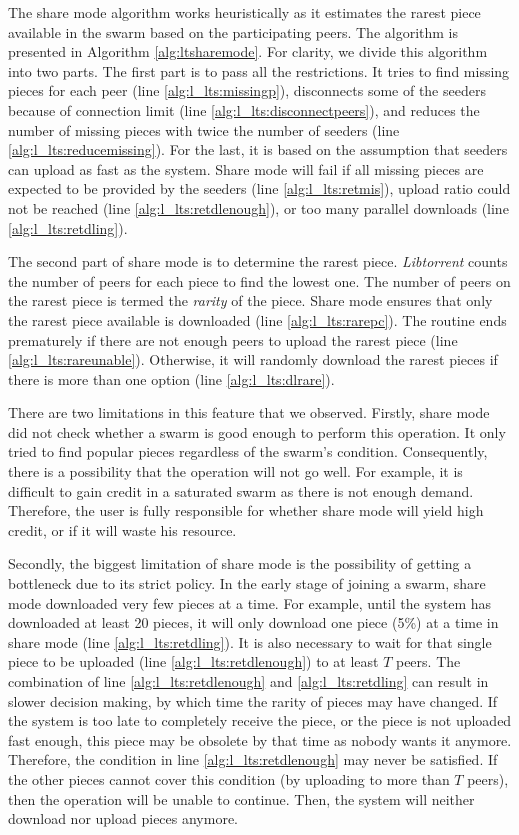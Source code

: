 The share mode algorithm works heuristically as it estimates the rarest piece available in the swarm based on the participating peers. The algorithm is presented in Algorithm \ref{alg:ltsharemode}. For clarity, we divide this algorithm into two parts. The first part is to pass all the restrictions. It tries to find missing pieces for each peer (line \ref{alg:l_lts:missingp}), disconnects some of the seeders because of connection limit (line \ref{alg:l_lts:disconnectpeers}), and reduces the number of missing pieces with twice the number of seeders (line \ref{alg:l_lts:reducemissing}). For the last, it is based on the assumption that seeders can upload as fast as the system. Share mode will fail if all missing pieces are expected to be provided by the seeders (line \ref{alg:l_lts:retmis}), upload ratio could not be reached (line \ref{alg:l_lts:retdlenough}), or too many parallel downloads (line \ref{alg:l_lts:retdling}).

The second part of share mode is to determine the rarest piece. \textit{Libtorrent} counts the number of peers for each piece to find the lowest one. The number of peers on the rarest piece is termed the \textit{rarity} of the piece. Share mode ensures that only the rarest piece available is downloaded (line \ref{alg:l_lts:rarepc}). The routine ends prematurely if there are not enough peers to upload the rarest piece (line \ref{alg:l_lts:rareunable}). Otherwise, it will randomly download the rarest pieces if there is more than one option (line \ref{alg:l_lts:dlrare}). 



There are two limitations in this feature that we observed. Firstly, share mode did not check whether a swarm is good enough to perform this operation. It only tried to find popular pieces regardless of the swarm's condition. Consequently, there is a possibility that the operation will not go well. For example, it is difficult to gain credit in a saturated swarm as there is not enough demand. Therefore, the user is fully responsible for whether share mode will yield high credit, or if it will waste his resource.

Secondly, the biggest limitation of share mode is the possibility of getting a bottleneck due to its strict policy. In the early stage of joining a swarm, share mode downloaded very few pieces at a time. For example, until the system has downloaded at least 20 pieces, it will only download one piece (5\%) at a time in share mode (line \ref{alg:l_lts:retdling}). It is also necessary to wait for that single piece to be uploaded (line \ref{alg:l_lts:retdlenough}) to at least $T$ peers. The combination of line \ref{alg:l_lts:retdlenough} and \ref{alg:l_lts:retdling} can result in slower decision making, by which time the rarity of pieces may have changed. If the system is too late to completely receive the piece, or the piece is not uploaded fast enough, this piece may be obsolete by that time as nobody wants it anymore. Therefore, the condition in line \ref{alg:l_lts:retdlenough} may never be satisfied. If the other pieces cannot cover this condition (by uploading to more than $T$ peers), then the operation will be unable to continue. Then, the system will neither download nor upload pieces anymore.

